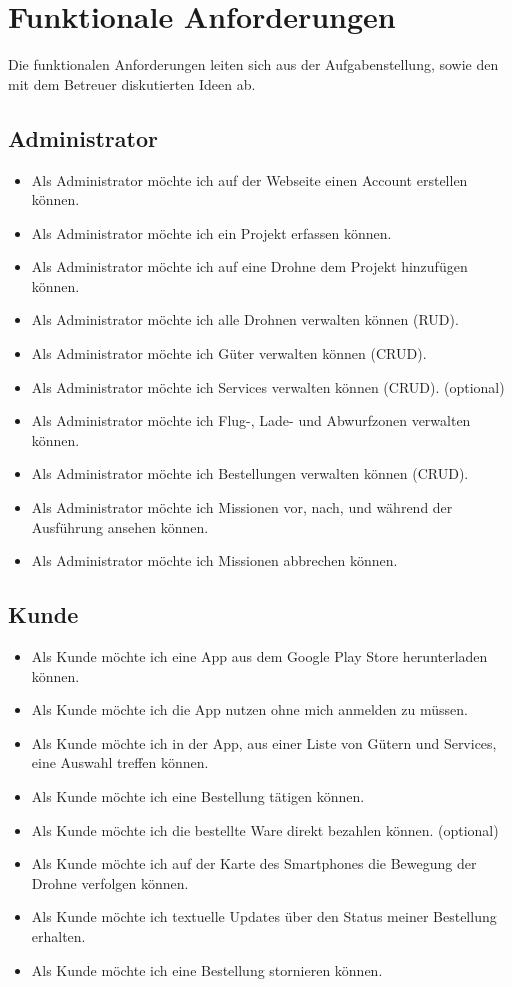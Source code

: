 \section{Funktionale Anforderungen}

Die funktionalen Anforderungen leiten sich aus der Aufgabenstellung, sowie den mit dem Betreuer diskutierten Ideen ab.

\subsection{Administrator}
\begin{itemize}
\item Als Administrator möchte ich auf der Webseite einen Account erstellen können.
\item Als Administrator möchte ich ein Projekt erfassen können.
\item Als Administrator möchte ich auf eine Drohne dem Projekt hinzufügen können.
\item Als Administrator möchte ich alle Drohnen verwalten können (RUD).
\item Als Administrator möchte ich Güter verwalten können (CRUD).
\item Als Administrator möchte ich Services verwalten können (CRUD). (optional)
\item Als Administrator möchte ich Flug-, Lade- und Abwurfzonen verwalten können.
\item Als Administrator möchte ich Bestellungen verwalten können (CRUD).


\item Als Administrator möchte ich Missionen vor, nach, und während der Ausführung ansehen können.
\item Als Administrator möchte ich Missionen abbrechen können.
\end{itemize}

\subsection{Kunde}
\begin{itemize}
\item Als Kunde möchte ich eine App aus dem Google Play Store herunterladen können.
\item Als Kunde möchte ich die App nutzen ohne mich anmelden zu müssen.
\item Als Kunde möchte ich in der App, aus einer Liste von Gütern und Services, eine Auswahl treffen können.
\item Als Kunde möchte ich eine Bestellung tätigen können.
\item Als Kunde möchte ich die bestellte Ware direkt bezahlen können. (optional)
\item Als Kunde möchte ich auf der Karte des Smartphones die Bewegung der Drohne verfolgen können.
\item Als Kunde möchte ich textuelle Updates über den Status meiner Bestellung erhalten.
\item Als Kunde möchte ich eine Bestellung stornieren können.
\end{itemize}

